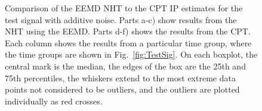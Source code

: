 \documentclass[a4paper]{IEEEtran}
\begin{document}
\begin{figure}[ht]
		\caption{Comparison of the EEMD NHT to the CPT IP estimates for the test signal with additive noise. Parts a-c) show results from the NHT using the EEMD. Parts d-f) shows the results from the CPT. Each column shows the results from a particular time group, where the time groups are shown in Fig.~\ref{fig:TestSig}. On each boxplot, the central mark is the median, the edges of the box are the 25th and 75th percentiles, the whiskers extend to the most extreme data points not considered to be outliers, and the outliers are plotted individually as red crosses.}
		\label{fig:RMSEComparison}
\end{figure}
\end{document}
